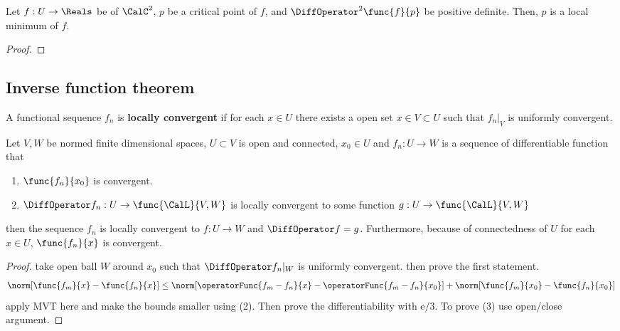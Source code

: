 \begin{theorem}
    Let \(f : U \to \Reals\) be of \(\CalC^2\), \(p\) be a critical point of \(f\), and \(\DiffOperator^2 \func{f}{p}\) be positive definite. Then, \(p\) is a local minimum of \(f\).
\end{theorem}

\begin{proof}

\end{proof}
\subsection{Inverse function theorem}

\begin{definition}
    A functional sequence \(f_n\) is \textbf{locally convergent} if for each \(x \in U\)  there exists a open set \(x \in V \subset U\) such that \(\left. f_n \right|_V\) is uniformly convergent.
\end{definition}

\begin{theorem}
    Let \(V,W\) be normed finite dimensional spaces, \(U \subset V\) is open and connected, \(x_0 \in U\) and \(f_n : U \to W\) is a sequence of differentiable function that
    \begin{enumerate}
        \item \(\func{f_n}{x_0}\) is convergent.
        \item \(\DiffOperator f_n : U \to \func{\CalL}{V,W}\) is locally convergent to some function \(g : U \to \func{\CalL}{V,W}\)
    \end{enumerate}
    then the sequence \(f_n\) is locally convergent to \(f : U \to W\) and \(\DiffOperator f = g\). Furthermore, because of connectedness of \(U\) for each \(x \in U\), \(\func{f_n}{x}\) is convergent.
\end{theorem}

\begin{proof}
    take open ball \(W\) around \(x_0\) such that \(\DiffOperator f_n|_W\) is uniformly convergent. then prove the first statement.
    \begin{equation*}
        \norm[\func{f_m}{x} - \func{f_n}{x}] \leq \norm[\operatorFunc{f_m - f_n}{x} - \operatorFunc{f_m - f_n}{x_0}] + \norm[\func{f_m}{x_0} - \func{f_n}{x_0}]
    \end{equation*}
    apply MVT here and make the bounds smaller using (2). Then prove the differentiability with e/3. To prove (3) use open/close argument.
\end{proof}

